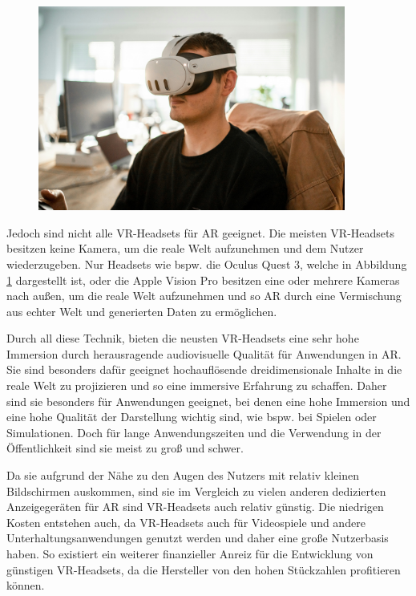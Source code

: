     \begin{figure}[H]
      \centering
      \includegraphics[width=0.9\textwidth]{images/quest3_example.jpg}
      \label{fig:oculus-quest-3}
    \end{figure}

    Jedoch sind nicht alle VR-Headsets für AR geeignet.
    Die meisten VR-Headsets besitzen keine Kamera, um die reale Welt aufzunehmen und dem Nutzer wiederzugeben.
    Nur Headsets wie bspw. die Oculus Quest 3, welche in Abbildung \ref{fig:oculus-quest-3} dargestellt ist, oder die Apple Vision Pro besitzen eine oder mehrere Kameras nach außen, um die reale Welt aufzunehmen und so AR durch eine Vermischung aus echter Welt und generierten Daten zu ermöglichen.
    
    Durch all diese Technik, bieten die neusten VR-Headsets eine sehr hohe Immersion durch herausragende audiovisuelle Qualität für Anwendungen in AR.
    Sie sind besonders dafür geeignet hochauflösende dreidimensionale Inhalte in die reale Welt zu projizieren und so eine immersive Erfahrung zu schaffen.
    Daher sind sie besonders für Anwendungen geeignet, bei denen eine hohe Immersion und eine hohe Qualität der Darstellung wichtig sind, wie bspw. bei Spielen oder Simulationen.
    Doch für lange Anwendungszeiten und die Verwendung in der Öffentlichkeit sind sie meist zu groß und schwer.

    Da sie aufgrund der Nähe zu den Augen des Nutzers mit relativ kleinen Bildschirmen auskommen, sind sie im Vergleich zu vielen anderen dedizierten Anzeigegeräten für AR sind VR-Headsets auch relativ günstig.
    Die niedrigen Kosten entstehen auch, da VR-Headsets auch für Videospiele und andere Unterhaltungsanwendungen genutzt werden und daher eine große Nutzerbasis haben.
    So existiert ein weiterer finanzieller Anreiz für die Entwicklung von günstigen VR-Headsets, da die Hersteller von den hohen Stückzahlen profitieren können.
   

